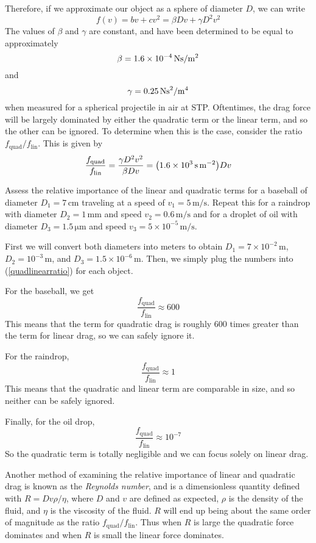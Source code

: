 Therefore, if we approximate our object as a sphere of diameter $D$, we can write
\[ f(v) = bv + cv^2 = \beta Dv + \gamma D^2v^2 \]
The values of $\beta$ and $\gamma$ are constant, and have been determined to be equal to approximately 
\[ \beta = 1.6\times 10^{-4}\,\si{\newton\second\per{\meter\tothe{2}}} \]
and
\[ \gamma = 0.25 \, \si{\newton\square\second\per\meter{\tothe{4}}} \]
when measured for a spherical projectile in air at STP. Oftentimes, the drag force will be largely dominated by either the quadratic term or the linear term, and so the other can be ignored. To determine when this is the case, consider the ratio $f_{\text{quad}}/f_{\text{lin}}$. This is given by
\begin{equation} \label{quadlinearratio}
    \frac{f_{\text{quad}}}{f_{\text{lin}}} = \frac{\gamma D^2v^2}{\beta Dv} = \pqty{1.6\times10^3 \,\si{\second\per\square\meter}}Dv
\end{equation}
\begin{example}
    Assess the relative importance of the linear and quadratic terms for a baseball of diameter $D_1 = 7\,\si{\centi\meter}$ traveling at a speed of $v_1 = 5\,\si{\meter\per\second}$. Repeat this for a raindrop with diameter $D_2 = 1\,\si{\milli\meter}$ and speed $v_2 = 0.6\,\si{\meter\per\second}$ and for a droplet of oil with diameter $D_3 = 1.5\,\si{\micro\meter}$ and speed $v_3 = 5\times10^{-5}\,\si{\meter\per\second}$.

    First we will convert both diameters into meters to obtain $D_1 = 7\times10^{-2}\,\si{\meter}$, $D_2 = 10^{-3}\,\si{\meter}$, and $D_3 = 1.5\times10^{-6}\,\si{\meter}$. Then, we simply plug the numbers into (\ref{quadlinearratio}) for each object.

    For the baseball, we get
    \[ \frac{f_{\text{quad}}}{f_{\text{lin}}} \approx 600 \]
    This means that the term for quadratic drag is roughly 600 times greater than the term for linear drag, so we can safely ignore it. 

    For the raindrop,
    \[ \frac{f_{\text{quad}}}{f_{\text{lin}}} \approx 1\]
    This means that the quadratic and linear term are comparable in size, and so neither can be safely ignored.

    Finally, for the oil drop,
    \[ \frac{f_{\text{quad}}}{f_{\text{lin}}} \approx 10^{-7} \]
    So the quadratic term is totally negligible and we can focus solely on linear drag.
\end{example}
Another method of examining the relative importance of linear and quadratic drag is known as the \textit{Reynolds number}, and is a dimensionless quantity defined with $R = Dv\rho/\eta$, where $D$ and $v$ are defined as expected, $\rho$ is the density of the fluid, and $\eta$ is the viscosity of the fluid. $R$ will end up being about the same order of magnitude as the ratio $f_{\text{quad}}/f_{\text{lin}}$. Thus when $R$ is large the quadratic force dominates and when $R$ is small the linear force dominates.
